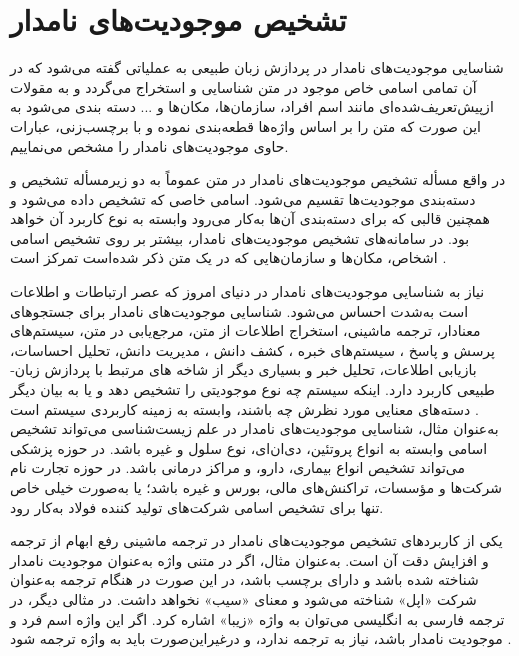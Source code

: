 \section{تشخیص موجودیت‌های نامدار}
شناسایی موجودیت­‌های نامدار در پردازش زبان طبیعی به عملیاتی گفته می‌­شود که در آن تمامی­ اسامی خاص موجود در متن شناسایی و استخراج می‌گردد و به مقولات ازپیش‌تعریف‌شده‌ای مانند اسم افراد، سازمان‌ها، مکان‌ها و ... دسته بندی می‌شود به این صورت که متن را بر اساس واژه‌ها قطعه‌بندی نموده و با برچسب‌زنی، عبارات حاوی موجودیت‌های نامدار را مشخص می‌نماییم.

در واقع مسأله تشخیص موجودیت‌های نامدار در متن عموماً به دو زیر‌مسأله تشخیص و دسته‌بندی موجودیت‌ها تقسیم می‌شود. اسامی خاصی که تشخیص داده می‌شود و همچنین قالبی که برای دسته‌بندی آن‌ها به‌کار می‌رود وابسته به نوع کاربرد آن خواهد‌ بود. در سامانه‌های تشخیص موجودیت‌های نامدار، بیشتر بر روی تشخیص اسامی اشخاص، مکان‌­ها و سازمان‌هایی که در یک متن ذکر شده‌است تمرکز است \citep{chen2015}.

نیاز به شناسایی موجودیت­‌های نامدار در دنیای امروز که عصر ارتباطات و اطلاعات است به‌شدت احساس می‌­شود. شناسایی موجودیت‌­های نامدار برای جستجوهای معنادار، ترجمه ماشینی، استخراج اطلاعات از متن، مرجع‌یابی در متن، سیستم­‌های پرسش و پاسخ ، سیستم‌های خبره ، کشف دانش ، مدیریت دانش، تحلیل احساسات، بازیابی اطلاعات، تحلیل خبر و بسیاری دیگر از شاخه های مرتبط با پردازش زبان­ طبیعی کاربرد دارد. اینکه سیستم چه نوع موجودیتی را تشخیص دهد و یا به بیان دیگر دسته‌های معنایی مورد نظرش چه باشند، وابسته به زمینه کاربردی سیستم است \citep{ABDALLAH201734}.\\
به‌عنوان مثال، شناسایی موجودیت‌های نامدار در علم زیست‌شناسی می‌­تواند تشخیص اسامی وابسته به انواع پروتئین­، دی‌ان‌­ای، نوع سلول و غیره باشد. در حوزه پزشکی می‌تواند تشخیص انواع بیماری، دارو، و مراکز درمانی باشد. در حوزه تجارت نام شرکت‌­ها و مؤسسات، تراکنش­‌های مالی، بورس و غیره باشد؛ یا به‌صورت خیلی خاص  تنها برای تشخیص اسامی شرکت­‌های تولید کننده فولاد به‌کار رود.

یکی از کاربردهای تشخیص موجودیت‌­های نامدار در ترجمه ماشینی رفع ابهام از ترجمه و افزایش دقت آن است. به‌عنوان مثال، اگر در متنی واژه  به‌عنوان موجودیت نامدار شناخته شده باشد و دارای برچسب باشد، در این صورت در هنگام ترجمه به‌عنوان شرکت «اپل» شناخته می‌­شود و معنای «سیب» نخواهد داشت. در مثالی دیگر، در ترجمه فارسی به انگلیسی می‌­توان به واژه «زیبا» اشاره کرد. اگر این واژه اسم فرد و موجودیت نامدار باشد، نیاز به ترجمه ندارد، و درغیراین‌­صورت باید به واژه  ترجمه شود \citep{Hussain2016}.

